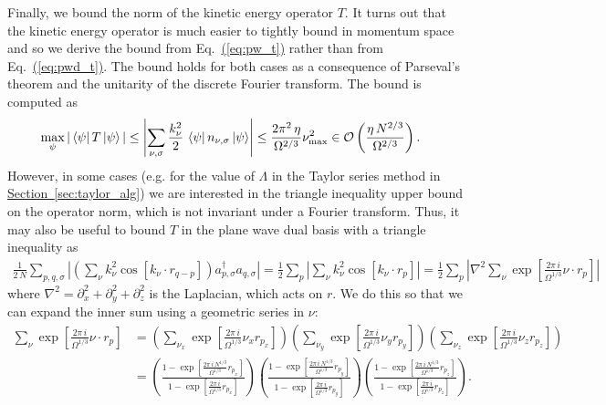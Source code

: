 \documentclass[superscriptaddress,aps,pra,nofootinbib,notitlepage,10pt,longbibliography]{revtex4-1}
\newcommand{\eq}[1]{Eq.~\hyperref[eq:#1]{(\ref*{eq:#1})}}
\renewcommand{\sec}[1]{\hyperref[sec:#1]{Section~\ref*{sec:#1}}}
\def\bra#1{\mathinner{\langle{#1}|}}
\def\ket#1{\mathinner{|{#1}\rangle}}
\begin{document}
Finally, we bound the norm of the kinetic energy operator $T$. It turns out that the kinetic energy operator is much easier to tightly bound in momentum space and so we derive the bound from \eq{pw_t} rather than from \eq{pwd_t}. The bound holds for both cases as a consequence of Parseval's theorem and the unitarity of the discrete Fourier transform. The bound is computed as
 \begin{align}
 \label{eq:t_bound}
 \max_{\psi} | \bra{\psi} T\ket{\psi}| & \le \left| \sum_{\nu,\sigma} \frac{k_\nu^2}{2} \, \bra{\psi}n_{\nu, \sigma}\ket{\psi} \right|
 \leq  \frac{2\pi^2 \, \eta}{\Omega^{2/3}}  \nu_{\max}^2 \in {\cal O}\left(\frac{\eta \, N^{2/3}}{\Omega^{2/3}}\right).
 \end{align}
However, in some cases (e.g. for the value of $\Lambda$ in the Taylor series method in \sec{taylor_alg}) we are interested in the triangle inequality upper bound on the operator norm, which is not invariant under a Fourier transform. Thus, it may also be useful to bound $T$ in the plane wave dual basis with a triangle inequality as
\begin{align}
\frac{1}{2\, N} \sum_{p, q, \sigma} \left | \left(\sum_\nu k_\nu^2 \cos \left[k_\nu \cdot r_{q - p} \right]\right) a^\dagger_{p, \sigma} a_{q,\sigma} \right |
%
=  \frac{1}{2} \sum_{p} \left | \sum_\nu k_\nu^2 \cos \left[k_\nu \cdot r_p\right] \right |
%
=  \frac{1}{2} \sum_{p} \left |\nabla^2  \sum_\nu \exp\left[\frac{2\pi \, i}{\Omega^{1/3}} \nu \cdot r_p\right] \right |
\end{align}
where $\nabla^2 = \partial^2_x + \partial^2_y + \partial^2_z$ is the Laplacian, which acts on $r$. We do this so that we can expand the inner sum using a geometric series in $\nu$:
\begin{align}
\sum_\nu \exp\left[\frac{2\pi \, i}{\Omega^{1/3}} \nu \cdot r_p\right] & =
%
\left(\sum_{\nu_x} \exp\left[\frac{2\pi \, i}{\Omega^{1/3}} \nu_x r_{p_x}\right]\right)
\left(\sum_{\nu_y} \exp\left[\frac{2\pi \, i}{\Omega^{1/3}} \nu_y  r_{p_y}\right]\right)
\left(\sum_{\nu_z} \exp\left[\frac{2\pi \, i}{\Omega^{1/3}} \nu_z r_{p_z}\right]\right)\\
%
& = \left(\frac{1- \exp\left[\frac{2\pi \, i \, N^{1/3}}{\Omega^{1/3}} r_{p_x}\right]}{1 - \exp\left[\frac{2\pi \, i}{\Omega^{1/3}} r_{p_x}\right]}\right)
\left(\frac{1- \exp\left[\frac{2\pi \, i \, N^{1/3}}{\Omega^{1/3}} r_{p_y}\right]}{1 - \exp\left[\frac{2\pi \, i}{\Omega^{1/3}} r_{p_y}\right]}\right)
\left(\frac{1- \exp\left[\frac{2\pi \, i \, N^{1/3}}{\Omega^{1/3}} r_{p_z}\right]}{1 - \exp\left[\frac{2\pi \, i}{\Omega^{1/3}} r_{p_z}\right]}\right)\nonumber.
\end{align}
\end{document}
